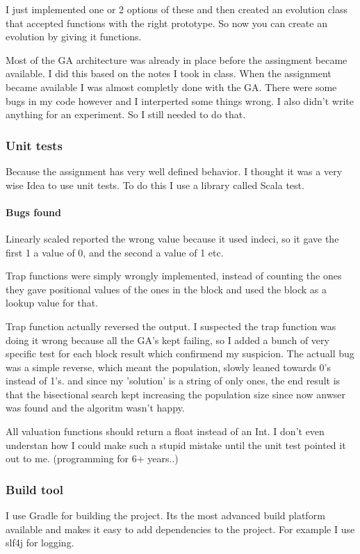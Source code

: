 \documentclass{article}
\begin{document}
\begin{empfile}
I just implemented one or 2 options of these and then created an evolution
class that accepted functions with the right prototype. So now you can
create an evolution by giving it functions.

Most of the GA architecture was already in place before the assingment became
available. I did this based on the notes I took in class. When the assignment
became available I was almost completly done with the GA. There were some bugs
in my code however and I interperted some things wrong. I also didn't write
anything for an experiment. So I still needed to do that.

\subsubsection{Unit tests}
Because the assignment has very well defined behavior. I thought it was
a very wise Idea to use unit tests. To do this I use a library called
Scala test.

\paragraph{Bugs found}
Linearly scaled reported the wrong value because it used indeci, so it
gave the first 1 a value of 0, and the second a value of 1 etc.

Trap functions were simply wrongly implemented, instead of counting the
ones they gave positional values of the ones in the block and used the
block as a lookup value for that.

Trap function actually reversed the output. I suspected the trap function
was doing it wrong because all the GA's kept failing, so I added a bunch
of very specific test for each block result which confirmend my suspicion.
The actuall bug was a simple reverse, which meant  the population, slowly
leaned towards 0's instead of 1's. and since my 'solution' is a string
of only ones, the end result is that the bisectional search kept increasing
the population size since now anwser was found and the algoritm wasn't happy.

All valuation functions should return a float instead of an Int.
I don't even understan how I could make such a stupid mistake until the
unit test pointed it out to me. (programming for 6+ years..)

\subsubsection{Build tool}
I use Gradle for building the project. Its the most advanced build platform
available and makes it easy to add dependencies to the project.
For example I use slf4j for logging.


\end{empfile}
\end{document}
